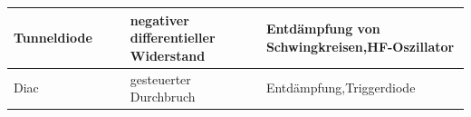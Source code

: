 {\begin{table}[H]
\begin{tabular}{ |p{2.2cm}|p{1.4cm}|p{3.3cm}|p{2.8cm}|p{3.3cm}| }
            \hline
            Tunnel\-diode
                                                                       &
            \begin{minipage}[t][2.4cm][c]{1.4cm}
                \centering 
            \end{minipage}
                                                                       &
            \begin{minipage}[t][2.4cm][c]{3.3cm}
                \centering 
            \end{minipage}
                                                                       &
            negativer differentieller Widerstand                       &
            Entdämpfung \newline von Schwingkreisen,\newline HF-Oszillator                                                                                  \\
            \hline
            Diac
                                                                       &
            \begin{minipage}[t][2.4cm][c]{1.4cm}
                \centering 
            \end{minipage}
                                                                       &
            \begin{minipage}[t][2.4cm][c]{3.3cm}
                \centering 
            \end{minipage}
                                                                       &
            gesteuerter Durchbruch                                     &
            Entdämpfung,\newline Triggerdiode                                                                                                               \\
            \hline
        \end{tabular}
    \end{table}
}

